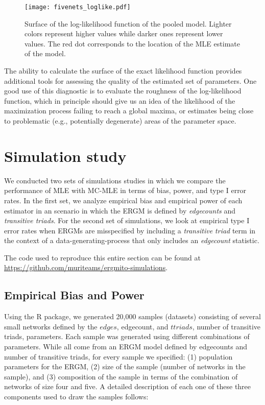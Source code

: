 \documentclass[review]{elsarticle}
\begin{document}
\begin{figure}[tb]
    \centering
    \caption{Surface of the log-likelihood function of the pooled \ergmito{} model. Lighter colors represent higher values while darker ones represent lower values. The red dot corresponds to the location of the MLE estimate of the model.}
    \texttt{[image: fivenets\_loglike.pdf]}
    \label{fig:fivenets-loglike}
\end{figure}

The ability to calculate the surface of the exact likelihood function provides additional tools for assessing the quality of the estimated set of parameters. One good use of this diagnostic is to evaluate the roughness of the log-likelihood function, which in principle should give us an idea of the likelihood of the maximization process failing to reach a global maxima, or estimates being close to problematic (e.g., potentially degenerate) areas of the parameter space.

\section{Simulation study}

We conducted two sets of simulations studies in which we compare the performance of MLE with MC-MLE in terms of bias, power, and type I error rates. In the first set, we analyze empirical bias and empirical power of each estimator in an scenario in which the ERGM is defined by \textit{edgecounts} and \textit{transitive triads}. For the second set of simulations, we look at empirical type I error rates when ERGMs are misspecified by including a \textit{transitive triad} term in the context of a data-generating-process that only includes an \textit{edgecount} statistic.

The code used to reproduce this entire section can be found at \url{https://github.com/muriteams/ergmito-simulations}.

\subsection{\label{subsec:design}Empirical Bias and Power}

Using the \ergmito{} R package, we generated 20,000 samples (datasets) consisting of several small networks defined by the $edges$, edgecount, and $ttriads$, number of transitive triads, parameters. Each sample was generated using different combinations of parameters. While all come from an ERGM model defined by edgecounts and number of transitive triads, for every sample we specified: (1) population parameters for the ERGM, (2) size of the sample (number of networks in the sample), and (3) composition of the sample in terms of the combination of networks of size four and five. A detailed description of each one of these three components used to draw the samples follows:
\end{document}
